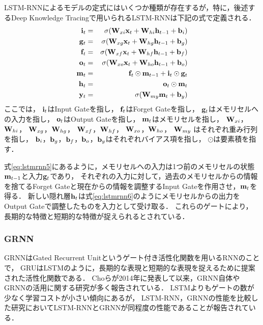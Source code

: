 LSTM-RNNによるモデルの定式にはいくつか種類が存在するが，特に，後述するDeep Knowledge Tracing\cite{piech2015deep}で用いられるLSTM-RNNは下記の式で定義される．
\begin{eqnarray}
\label{eq:lstmrnn1}
{\bf i}_t &=& \sigma({\bf W}_{xi}{\bf x}_t + {\bf W}_{hi}{\bf h}_{t-1} + {\bf b}_i) \\
\label{eq:lstmrnn2}
{\bf g}_t &=& \sigma({\bf W}_{xg}{\bf x}_t + {\bf W}_{hg}{\bf h}_{t-1} + {\bf b}_g) \\
\label{eq:lstmrnn3}
{\bf f}_t &=& \sigma({\bf W}_{xf}{\bf x}_t + {\bf W}_{hf}{\bf h}_{t-1} + {\bf b}_f) \\
\label{eq:lstmrnn4}
{\bf o}_t &=& \sigma({\bf W}_{xo}{\bf x}_t + {\bf W}_{ho}{\bf h}_{t-1} + {\bf b}_o) \\
\label{eq:lstmrnn5}
{\bf m}_t &=& {\bf f}_t \odot {\bf m}_{t-1} + {\bf i}_t \odot {\bf g}_t \\
\label{eq:lstmrnn6}
{\bf h}_t &=& {\bf o}_t \odot {\bf m}_t  \\
\label{eq:lstmrnn7}
{\bf y}_t &=& \sigma({\bf W}_{my} {\bf m}_t + {\bf b}_y) 
\end{eqnarray}
ここでは，
${\bf i}_t$はInput Gateを指し，
${\bf f}_t$はForget Gateを指し，
${\bf g}_t$はメモリセルへの入力を指し，
${\bf o}_t$はOutput Gateを指し，
${\bf m}_t$はメモリセルを指し，
${\bf W}_{xi}$，${\bf W}_{hi}$，
${\bf W}_{xg}$，${\bf W}_{hg}$，
${\bf W}_{xf}$，${\bf W}_{hf}$，
${\bf W}_{xo}$，${\bf W}_{ho}$，
${\bf W}_{my}$
はそれぞれ重み行列を指し，
${\bf b}_i$，${\bf b}_g$，${\bf b}_f$，${\bf b}_o$，${\bf b}_y$はそれぞれバイアス項を指し，
$\odot$は要素積を指す．

式\ref{eq:lstmrnn5}にあるように，メモリセルへの入力は1つ前のメモリセルの状態${\bf m}_{t-1}$と入力${\bf g}_t$であり，
それぞれの入力に対して，過去のメモリセルからの情報を捨てるForget Gateと現在からの情報を調整するInput Gateを作用させ，${\bf m}_t$を得る．
新しい隠れ層${\bf h}_t$は式\ref{eq:lstmrnn6}のようにメモリセルからの出力をOutput Gateで調整したものを入力として受け取る．
これらのゲートにより，
長期的な特徴と短期的な特徴が捉えられるとされている．

\subsubsection{GRNN}
GRNNはGated Recurrent Unit\cite{cho2014learning}というゲート付き活性化関数を用いるRNNのことで，
GRUはLSTMのように，長期的な表現と短期的な表現を捉えるために提案された活性化関数である．
Choら\cite{cho2014learning}が2014年に発表して以来，GRNN自体やGRNNの活用に関する研究が多く報告されている\cite{chung2014empirical, zaremba2015empirical, chung2015gated, karpathy2015visualizing, biswassentiment, pezeshki2015sequence}．
LSTMよりもゲートの数が少なく学習コストが小さい傾向にあるが，
LSTM-RNN，GRNNの性能を比較した研究\cite{chung2014empirical, zaremba2015empirical}においてLSTM-RNNとGRNNが同程度の性能であることが報告されている．

